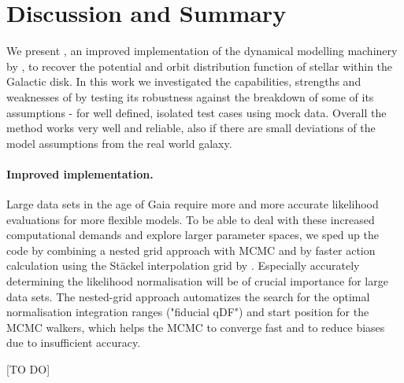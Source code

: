 \section{Discussion and Summary}

We present \RM, an improved implementation of the dynamical modelling machinery by \citet{bov13}, to recover the potential and orbit distribution function of stellar \MAPs within the Galactic disk. In this work we investigated the capabilities, strengths and weaknesses of \RM by testing its robustness against the breakdown of some of its assumptions - for well defined, isolated test cases using mock data. Overall the method works very well and reliable, also if there are small deviations of the model assumptions from the real world galaxy.

\paragraph{Improved implementation.} Large data sets in the age of Gaia require more and more accurate likelihood evaluations for more flexible models. To be able to deal with these increased computational demands and explore larger parameter spaces, we sped up the code by combining a nested grid approach with MCMC and by faster action calculation using the St\"{a}ckel \citep{bin12} interpolation grid by \citet{bov15}. Especially accurately determining the likelihood normalisation will be of crucial importance for large data sets. The nested-grid approach automatizes the search for the optimal normalisation integration ranges ("fiducial qDF") and start position for the MCMC walkers, which helps the MCMC to converge fast and to reduce biases due to insufficient accuracy.

[TO DO]

